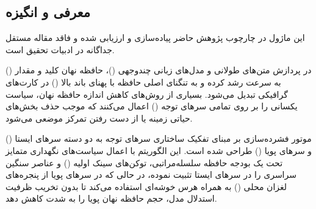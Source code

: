 \subsection{معرفی و انگیزه}
این ماژول در چارچوب پژوهش حاضر پیاده‌سازی و ارزیابی شده و فاقد مقاله مستقل جداگانه در ادبیات تحقیق است.

در پردازش متن‌های طولانی و مدل‌های زبانی چندوجهی ()، حافظه نهان کلید و مقدار () به سرعت رشد کرده و به تنگنای اصلی حافظه با پهنای باند بالا () در کارت‌های گرافیکی تبدیل می‌شود. بسیاری از روش‌های کاهش اندازه حافظه نهان، سیاست یکسانی را بر روی تمامی سرهای توجه () اعمال می‌کنند که موجب حذف بخش‌های حیاتی زمینه یا از دست رفتن تمرکز موضعی می‌شود.

موتور فشرده‌سازی  بر مبنای تفکیک ساختاری سرهای توجه به دو دسته سرهای ایستا () و سرهای پویا () طراحی شده است. این الگوریتم با اعمال سیاست‌های نگهداری متمایز تحت یک بودجه حافظه سلسله‌مراتبی، توکن‌های سینک اولیه () و عناصر سنگین سراسری را در سرهای ایستا تثبیت نموده، در حالی که در سرهای پویا از پنجره‌های لغزان محلی () به همراه هرس خوشه‌ای استفاده می‌کند تا بدون تخریب ظرفیت استدلال مدل، حجم حافظه نهان پویا را به شدت کاهش دهد.
